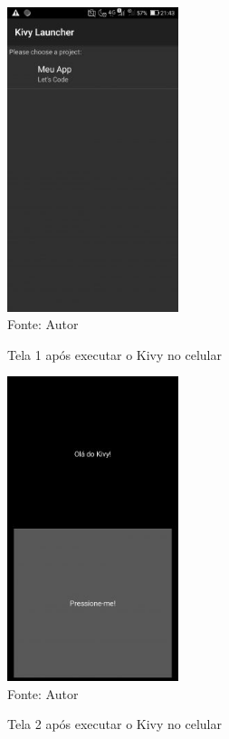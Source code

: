 \begin{figure}[H]
	\begin{center}
		\caption{Tela 1 após executar o Kivy no celular} \label{ling1}
		\includegraphics[width=5cm]{1mobile.JPG} \\
		{\tiny \sf Fonte:{ Autor}}
	\end{center}
\end{figure}

\begin{figure}[H]
	\begin{center}
		\caption{Tela 2 após executar o Kivy no celular} \label{ling1}
		\includegraphics[width=5cm]{2mobile.JPG} \\
		{\tiny \sf Fonte:{ Autor}}
	\end{center}
\end{figure}